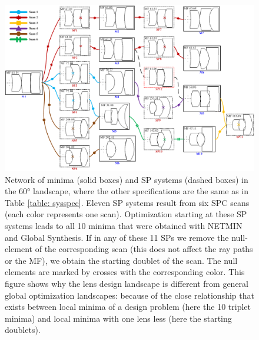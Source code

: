 \begin{figure}[h!]
    \centering
    \includegraphics[scale=0.41]{chapter-3/figures/TripletNetwork.png}
    \caption{Network of minima (solid boxes) and SP systems (dashed boxes) in the 60° landscape, where the other specifications are the same as in Table \ref{table: sysspec}. Eleven SP systems result from six SPC scans (each color represents one scan). Optimization starting at these SP systems leads to all 10 minima that were obtained with NETMIN and Global Synthesis. If in any of these 11 SPs we remove the null-element of the corresponding scan (this does not affect the ray paths or the MF), we obtain the starting doublet of the scan. The null elements are marked by crosses with the corresponding color. This figure shows why the lens design landscape is different from general global optimization landscapes: because of the close relationship that exists between local minima of a design problem (here the 10 triplet minima) and local minima with one lens less (here the starting doublets).}\label{fig:tripletnetwork}
\end{figure}

